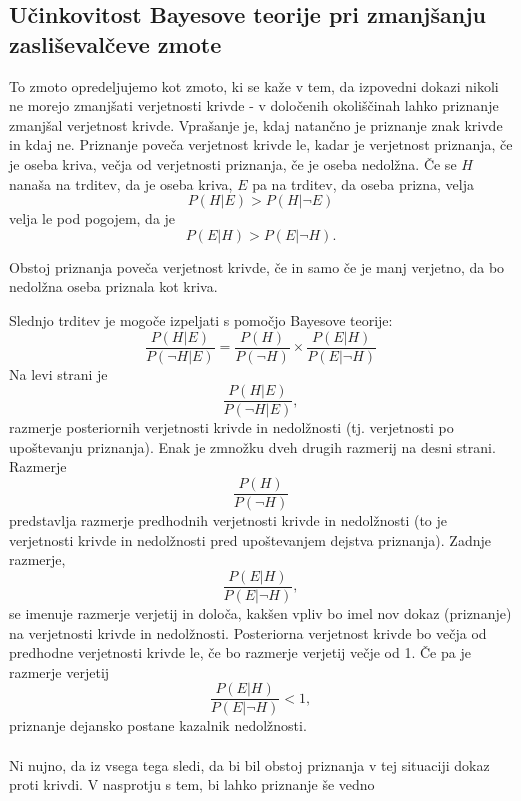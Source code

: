 \documentclass[fin1, tisk]{fmfdelo}
\theoremstyle{definition}
\theoremstyle{trditev}
\theoremstyle{izrek}
\begin{document}
\subsection{Učinkovitost Bayesove teorije pri zmanjšanju zasliševalčeve zmote}
To zmoto opredeljujemo kot zmoto, ki se kaže v tem, da izpovedni dokazi nikoli ne morejo zmanjšati verjetnosti krivde - v določenih okoliščinah 
lahko priznanje zmanjšal verjetnost krivde. Vprašanje je, kdaj natančno je priznanje znak krivde in kdaj ne. Priznanje poveča verjetnost krivde 
le, kadar je verjetnost priznanja, če je oseba kriva, večja od verjetnosti priznanja, če je oseba nedolžna. Če se $H$ nanaša na trditev, da je 
oseba kriva, $E$ pa na trditev, da oseba prizna, velja
\[
    P(H \lvert E) > P(H \lvert \neg E)
\]  
velja le pod pogojem, da je 
\[
    P(E \lvert H) > P(E \lvert \neg H).
\] 
\begin{trditev}
    Obstoj priznanja poveča verjetnost krivde, če in samo če je manj verjetno, da bo nedolžna oseba priznala kot kriva.
\end{trditev}
Slednjo trditev je mogoče izpeljati s pomočjo Bayesove teorije:
\begin{equation}\label{eq:btrditev}
    \frac{P(H \lvert E)}{P(\neg H \lvert E)} = \frac{P(H)}{P(\neg H)}  \times \frac{P(E \lvert H)}{P(E \lvert \neg H)}
\end{equation}
Na levi strani je 
\[
    \frac{P(H \lvert E)}{P(\neg H \lvert E)},
\] 
razmerje posteriornih verjetnosti krivde in nedolžnosti (tj. verjetnosti po 
upoštevanju priznanja). Enak je zmnožku dveh drugih razmerij na desni strani. Razmerje 
\[
    \frac{P(H)}{P(\neg H)}
\]
predstavlja razmerje predhodnih 
verjetnosti krivde in nedolžnosti (to je verjetnosti krivde in nedolžnosti pred upoštevanjem dejstva priznanja). Zadnje razmerje, 
\[
    \frac{P(E \lvert H)}{P(E \lvert \neg H)},
\] 
se imenuje razmerje verjetij in določa, kakšen vpliv bo imel nov dokaz (priznanje) na 
verjetnosti krivde in nedolžnosti. Posteriorna verjetnost krivde bo večja od predhodne verjetnosti krivde le, če bo razmerje verjetij 
večje od 1. Če pa je razmerje verjetij 
\[
    \frac{P(E \lvert H)}{P(E \lvert \neg H)} < 1,
\] 
priznanje dejansko postane kazalnik nedolžnosti. \\\\
Ni nujno, da iz vsega tega sledi, da bi bil obstoj priznanja v tej situaciji dokaz proti krivdi. V nasprotju s tem, bi lahko priznanje še vedno 
\end{document}
